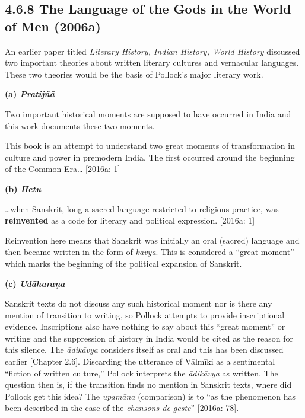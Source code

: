 \subsection*{4.6.8 The Language of the Gods in the World of Men (2006a)}

An earlier paper titled \textit{Literary History, Indian History, World History }discussed two important theories about written literary cultures and vernacular languages. These two theories would be the basis of Pollock’s major literary work.

\textbf{(a) \textit{Pratijñā }}

Two important historical moments are supposed to have occurred in India and this work documents these two moments.

\begin{myquote}
This book is an attempt to understand two great moments of transformation in culture and power in premodern India. The ﬁrst occurred around the beginning of the Common Era… [2016a: 1]
\end{myquote}

\textbf{(b) \textit{Hetu}}

\begin{myquote}
…when Sanskrit, long a sacred language restricted to religious practice, was \textbf{reinvented} as a code for literary and political expression. [2016a: 1]
\end{myquote}

Reinvention here means that Sanskrit was initially an oral (sacred) language and then became written in the form of \textit{kāvya}. This is considered a “great moment” which marks the beginning of the political expansion of Sanskrit.

\textbf{(c) \textit{Udāharaṇa}}

Sanskrit texts do not discuss any such historical moment nor is there any mention of transition to writing, so Pollock attempts to provide inscriptional evidence. Inscriptions also have nothing to say about this “great moment” or writing and the suppression of history in India would be cited as the reason for this silence. The \textit{ādikāvya }considers itself as oral and this has been discussed earlier [Chapter 2.6]. Discarding the utterance of Vālmīki as a sentimental “ﬁction of written culture,” Pollock interprets the \textit{ādikāvya }as written. The question then is, if the transition finds no mention in Sanskrit texts, where did Pollock get this idea? The \textit{upamāna} (comparison) is to “as the phenomenon has been described in the case of the \textit{chansons de geste}” [2016a: 78].

